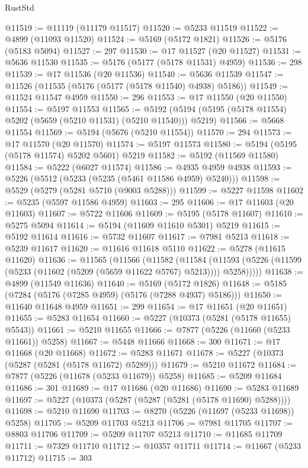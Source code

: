 \begin{lexlean}{RustStd}
\begin{coremodule}
@11519 := @11119 (@11179 @11517)
@11520 := @5233 @11519
@11522 := @4899 (@11093 @11520)
@11524 := @5169 (@5172 @1821)
@11526 := @5176 (@5183 @5094)
@11527 := 297
@11530 := @17 @11527 (@20 @11527)
@11531 := @5636 @11530
@11535 := @5176 (@5177 (@5178 @11531) @4959)
@11536 := 298
@11539 := @17 @11536 (@20 @11536)
@11540 := @5636 @11539
@11547 := @11526 (@11535 (@5176 (@5177 (@5178 @11540) @4938) @5186))
@11549 := @11524 @11547 @4959
@11550 := 296
@11553 := @17 @11550 (@20 @11550)
@11554 := @5197 @11553
@11565 := @5192 (@5194 (@5195 (@5178 @11554) @5202 (@5659 (@5210 @11531) (@5210 @11540))) @5219)
@11566 := @5668 @11554
@11569 := @5194 (@5676 (@5210 @11554))
@11570 := 294
@11573 := @17 @11570 (@20 @11570)
@11574 := @5197 @11573
@11580 := @5194 (@5195 (@5178 @11574) @5202 @5601) @5219
@11582 := @5192 (@11569 @11580)
@11584 := @5222 (@6027 @11574)
@11586 := @4935 @4959 @4938
@11593 := @5226 (@5512 (@5233 (@5235 (@5461 @11586 @4959) @5240)))
@11598 := @5529 (@5279 (@5281 @5710 (@9003 @5288)))
@11599 := @5227 @11598
@11602 := @5235 (@5597 @11586 @4959)
@11603 := 295
@11606 := @17 @11603 (@20 @11603)
@11607 := @5722 @11606
@11609 := @5195 (@5178 @11607)
@11610 := @5275 @5094
@11614 := @5194 (@11609 @11610 @5301) @5219
@11615 := @5192 @11614
@11616 := @5732 @11607
@11617 := @7981 @5213
@11618 := @5239 @11617
@11620 := @11616 @11618 @5110
@11622 := @5278 (@11615 @11620)
@11636 := @11565
    (@11566
      (@11582
        (@11584
          (@11593 (@5226 (@11599 (@5233 (@11602 (@5209 (@5659 @11622 @5767) @5213)))) @5258)))))
@11638 := @4899 (@11549 @11636)
@11640 := @5169 (@5172 @1826)
@11648 := @5185 (@7284 (@5176 (@7285 @4959) (@5176 (@7288 @4937) @5186)))
@11650 := @11640 @11648 @4959
@11651 := 299
@11654 := @17 @11651 (@20 @11651)
@11655 := @5283 @11654
@11660 := @5227 (@10373 (@5281 (@5178 @11655) @5543))
@11661 := @5210 @11655
@11666 := @7877 (@5226 (@11660 (@5233 @11661)) @5258)
@11667 := @5448 @11666
@11668 := 300
@11671 := @17 @11668 (@20 @11668)
@11672 := @5283 @11671
@11678 := @5227 (@10373 (@5287 (@5281 (@5178 @11672) @5289)))
@11679 := @5210 @11672
@11684 := @7877 (@5226 (@11678 (@5233 @11679)) @5258)
@11685 := @5209 @11684
@11686 := 301
@11689 := @17 @11686 (@20 @11686)
@11690 := @5283 @11689
@11697 := @5227 (@10373 (@5287 (@5287 (@5281 (@5178 @11690) @5288))))
@11698 := @5210 @11690
@11703 := @8270 (@5226 (@11697 (@5233 @11698)) @5258)
@11705 := @5209 @11703 @5213
@11706 := @7981 @11705
@11707 := @8803 @11706
@11709 := @5209 @11707 @5213
@11710 := @11685 @11709
@11711 := @7329 @11710
@11712 := @10357 @11711
@11714 := @11667 (@5233 @11712)
@11715 := 303

\end{coremodule}
\end{lexlean}
